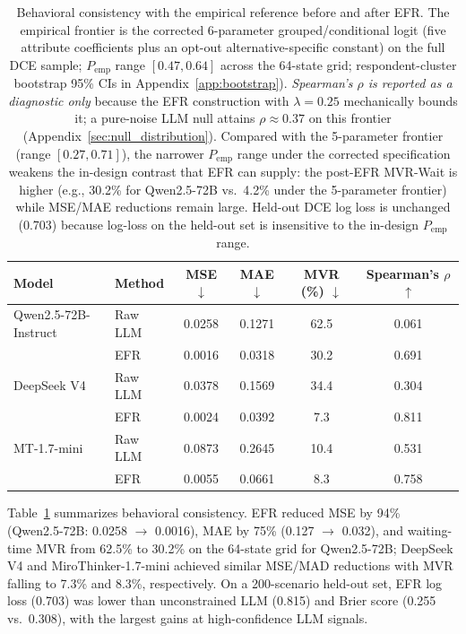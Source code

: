 \documentclass[11pt]{article}
\begin{document}
\begin{table}[t]
\centering
\caption{Behavioral consistency with the empirical reference before and after EFR. The empirical frontier is the corrected 6-parameter grouped/conditional logit (five attribute coefficients plus an opt-out alternative-specific constant) on the full DCE sample; $P_{\mathrm{emp}}$ range $[0.47, 0.64]$ across the 64-state grid; respondent-cluster bootstrap 95\% CIs in Appendix~\ref{app:bootstrap}). \emph{Spearman's $\rho$ is reported as a diagnostic only} because the EFR construction with $\lambda = 0.25$ mechanically bounds it; a pure-noise LLM null attains $\rho \approx 0.37$ on this frontier (Appendix~\ref{sec:null_distribution}). Compared with the 5-parameter frontier (range $[0.27, 0.71]$), the narrower $P_{\mathrm{emp}}$ range under the corrected specification weakens the in-design contrast that EFR can supply: the post-EFR MVR-Wait is higher (e.g., 30.2\% for Qwen2.5-72B vs.\ 4.2\% under the 5-parameter frontier) while MSE/MAE reductions remain large. Held-out DCE log loss is unchanged (0.703) because log-loss on the held-out set is insensitive to the in-design $P_{\mathrm{emp}}$ range.}
\label{tab:behavioral_alignment}

\begin{tabular}{llcccc}
\toprule
Model & Method & MSE $\downarrow$ & MAE $\downarrow$ & MVR (\%) $\downarrow$ & Spearman's $\rho$ $\uparrow$\\
\midrule

Qwen2.5-72B-Instruct
& Raw LLM
& 0.0258
& 0.1271
& 62.5
& 0.061 \\

& EFR
& 0.0016
& 0.0318
& 30.2
& 0.691 \\

\addlinespace

DeepSeek V4
& Raw LLM
& 0.0378
& 0.1569
& 34.4
& 0.304 \\

& EFR
& 0.0024
& 0.0392
& 7.3
& 0.811 \\

\addlinespace

MT-1.7-mini
& Raw LLM
& 0.0873
& 0.2645
& 10.4
& 0.531 \\

& EFR
& 0.0055
& 0.0661
& 8.3
& 0.758 \\

\bottomrule
\end{tabular}
\end{table}

Table~\ref{tab:behavioral_alignment} summarizes behavioral consistency. EFR reduced MSE by 94\% (Qwen2.5-72B: 0.0258 $\to$ 0.0016), MAE by 75\% (0.127 $\to$ 0.032), and waiting-time MVR from 62.5\% to 30.2\% on the 64-state grid for Qwen2.5-72B; DeepSeek V4 and MiroThinker-1.7-mini achieved similar MSE/MAD reductions with MVR falling to 7.3\% and 8.3\%, respectively. On a 200-scenario held-out set, EFR log loss (0.703) was lower than unconstrained LLM (0.815) and Brier score (0.255 vs.\ 0.308), with the largest gains at high-confidence LLM signals.
\end{document}
